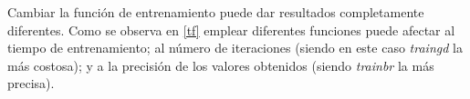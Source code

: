 \documentclass{article}
\begin{document}
Cambiar la función de entrenamiento puede dar resultados completamente
diferentes. Como se observa en \hyperref[tf]{\ref{tf}} emplear diferentes
funciones puede afectar al tiempo de entrenamiento; al número de iteraciones
(siendo en este caso \textit{traingd} la más costosa); y a la precisión de los
valores obtenidos (siendo \textit{trainbr} la más precisa).
\end{document}
